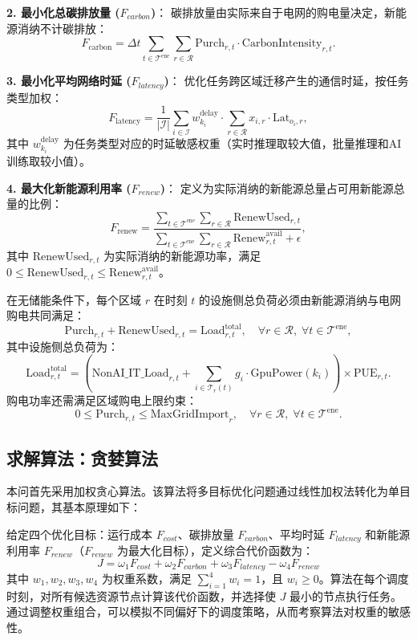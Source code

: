 \documentclass[UTF8,a4paper,zihao=-4]{ctexart}
\begin{document}
\textbf{2. 最小化总碳排放量 ($F_{carbon}$)}：
碳排放量由实际来自于电网的购电量决定，新能源消纳不计碳排放：
\[
F_{\text{carbon}} = \Delta t \sum_{t \in \mathcal{T}^{\text{ene}}} \sum_{r \in \mathcal{R}} \text{Purch}_{r,t} \cdot \text{CarbonIntensity}_{r,t}.
\]

\textbf{3. 最小化平均网络时延 ($F_{latency}$)}：
优化任务跨区域迁移产生的通信时延，按任务类型加权：
\[
F_{\text{latency}} = \frac{1}{|\mathcal{I}|} \sum_{i \in \mathcal{I}} w_{k_i}^{\text{delay}} \cdot \sum_{r \in \mathcal{R}} x_{i,r} \cdot \text{Lat}_{o_i, r},
\]
其中 $w_{k_i}^{\text{delay}}$ 为任务类型对应的时延敏感权重（实时推理取较大值，批量推理和AI训练取较小值）。

\textbf{4. 最大化新能源利用率 ($F_{renew}$)}：
定义为实际消纳的新能源总量占可用新能源总量的比例：
\[
F_{\text{renew}} = \frac{\sum_{t \in \mathcal{T}^{\text{ene}}} \sum_{r \in \mathcal{R}} \text{RenewUsed}_{r,t}}{\sum_{t \in \mathcal{T}^{\text{ene}}} \sum_{r \in \mathcal{R}} \text{Renew}_{r,t}^{\text{avail}} + \epsilon},
\]
其中 $\text{RenewUsed}_{r,t}$ 为实际消纳的新能源功率，满足 $0 \leq \text{RenewUsed}_{r,t} \leq \text{Renew}_{r,t}^{\text{avail}}$。


在无储能条件下，每个区域 $r$ 在时刻 $t$ 的设施侧总负荷必须由新能源消纳与电网购电共同满足：
\[
\text{Purch}_{r,t} + \text{RenewUsed}_{r,t} = \text{Load}_{r,t}^{\text{total}}, \quad \forall r \in \mathcal{R},\; \forall t \in \mathcal{T}^{\text{ene}},
\]
其中设施侧总负荷为：
\[
\text{Load}_{r,t}^{\text{total}} = \left( \text{NonAI\_IT\_Load}_{r,t} + \sum_{i \in \mathcal{T}_r(t)} g_i \cdot \text{GpuPower}(k_i) \right) \times \text{PUE}_{r,t}.
\]
购电功率还需满足区域购电上限约束：
\[
0 \leq \text{Purch}_{r,t} \leq \text{MaxGridImport}_r, \quad \forall r \in \mathcal{R},\; \forall t \in \mathcal{T}^{\text{ene}}.
\]


\subsection{求解算法：贪婪算法}
本问首先采用加权贪心算法。该算法将多目标优化问题通过线性加权法转化为单目标问题，其基本原理如下：

给定四个优化目标：运行成本 \({F}_{cost}\)、碳排放量 \({F}_{carbon}\)、平均时延 \({F}_{latency}\) 和新能源利用率 \({F}_{renew}\)（\({F}_{renew}\) 为最大化目标），定义综合代价函数为：
$$
 J= \omega_1 {F}_{cost} + \omega_2 {F}_{carbon} + \omega_3 {F}_{latency} - \omega_4 {F}_{renew}
$$
其中 \(w_1, w_2, w_3, w_4\) 为权重系数，满足 \(\sum_{i=1}^4 w_i = 1\)，且 \(w_i \ge 0\)。算法在每个调度时刻，对所有候选资源节点计算该代价函数，并选择使 \(J\) 最小的节点执行任务。通过调整权重组合，可以模拟不同偏好下的调度策略，从而考察算法对权重的敏感性。
\end{document}
